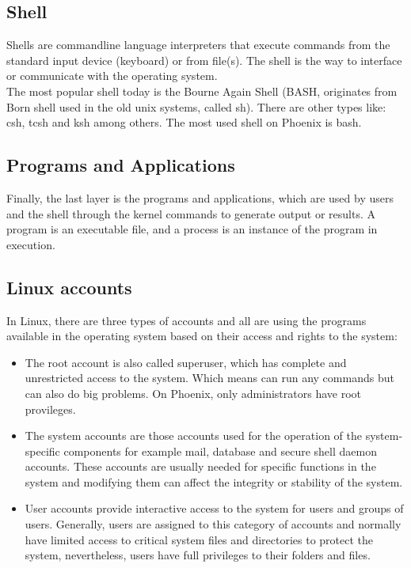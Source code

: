 \subsection{Shell}
Shells are commandline language interpreters that execute commands from the standard input device (keyboard) or from file(s).
The shell is the way to interface or communicate with the operating system. 
\\
The most popular shell today is the Bourne Again Shell (BASH, originates from Born shell used in the old unix systems, called sh). There are other types like: 
csh, tcsh and ksh among others. The most used shell on Phoenix is bash.

\subsection{Programs and Applications}
Finally, the last layer is the programs and applications, which are used by users and the shell through the kernel commands to generate output or results.
A program is an executable file, and a process is an instance of the program in execution. 

\subsection{Linux accounts}
In Linux, there are three types of accounts and all are using the programs available in the operating system based on their access and rights to the system:
\begin{itemize}
\item The root account is also called superuser, which has complete and unrestricted access to the system.
Which means can run any commands but can also do big problems. On Phoenix, only administrators have root provileges.
\item The system accounts are those accounts used for the operation of the system-specific components for example mail, database and secure shell daemon accounts. These accounts are usually needed for specific functions in the system and modifying them can affect the integrity or stability of the system.
\item User accounts provide interactive access to the system for users and groups of users. 
Generally, users are assigned to this category of accounts and normally have limited access to critical system files and directories to protect the system, nevertheless,
users have full privileges to their folders and files.
\end{itemize} 

